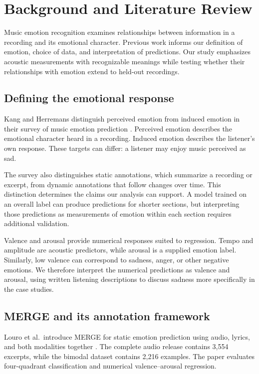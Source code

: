 \section{Background and Literature Review}
\label{sec:literature}

Music emotion recognition examines relationships between information in a recording and its emotional character. Previous work informs our definition of emotion, choice of data, and interpretation of predictions. Our study emphasizes acoustic measurements with recognizable meanings while testing whether their relationships with emotion extend to held-out recordings.

\subsection{Defining the emotional response}

Kang and Herremans distinguish perceived emotion from induced emotion in their survey of music emotion prediction \cite[Secs.~II and V]{kang2025survey}. Perceived emotion describes the emotional character heard in a recording. Induced emotion describes the listener's own response. These targets can differ: a listener may enjoy music perceived as sad.

The survey also distinguishes static annotations, which summarize a recording or excerpt, from dynamic annotations that follow changes over time. This distinction determines the claims our analysis can support. A model trained on an overall label can produce predictions for shorter sections, but interpreting those predictions as measurements of emotion within each section requires additional validation.

Valence and arousal provide numerical responses suited to regression. Tempo and amplitude are acoustic predictors, while arousal is a supplied emotion label. Similarly, low valence can correspond to sadness, anger, or other negative emotions. We therefore interpret the numerical predictions as valence and arousal, using written listening descriptions to discuss sadness more specifically in the case studies.

\subsection{MERGE and its annotation framework}

Louro et al.\ introduce MERGE for static emotion prediction using audio, lyrics, and both modalities together \cite[Secs.~III--V]{louro2025merge}. The complete audio release contains 3,554 excerpts, while the bimodal dataset contains 2,216 examples. The paper evaluates four-quadrant classification and numerical valence--arousal regression.

